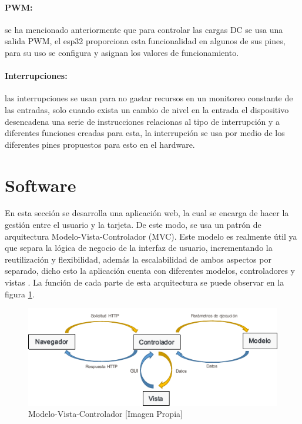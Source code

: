 \paragraph{PWM:}

se ha mencionado anteriormente que para controlar las cargas DC se usa una salida PWM, el esp32 proporciona esta funcionalidad en algunos de sus pines, para su uso se configura y asignan los valores de funcionamiento.

\paragraph{Interrupciones:}

las interrupciones se usan para no gastar recursos en un monitoreo constante de las entradas, solo cuando exista un cambio de nivel en la entrada el dispositivo desencadena una serie de instrucciones relacionas al tipo de interrupción y a diferentes funciones creadas para esta, la interrupción se usa por medio de los diferentes pines propuestos para esto en el hardware.

\section{Software}

En esta sección se desarrolla una aplicación web, la cual se encarga de hacer la gestión entre el usuario y la tarjeta. De este modo, se usa un patrón de arquitectura Modelo-Vista-Controlador (MVC). Este modelo es realmente útil ya que separa la lógica de negocio de la interfaz de usuario, incrementando la reutilización y flexibilidad, además la escalabilidad de ambos aspectos por separado, dicho esto la aplicación cuenta con diferentes modelos, controladores y vistas \cite{MVC1}. La función de cada parte de esta arquitectura se puede observar en la figura \ref{fig:mvc}.\\

\begin{figure}[H]
	\centering
	\caption{Modelo-Vista-Controlador [Imagen Propia]}
	\label{fig:mvc}
	\includegraphics[width=0.7\linewidth]{Imagenes/MVC}
\end{figure}


